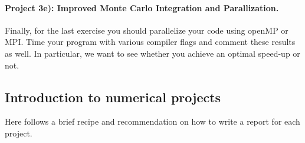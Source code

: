 \documentclass[%
oneside,                 %
final,                   %
10pt]{article}
\begin{document}
\paragraph{Project  3e): Improved Monte Carlo Integration and Parallization.}
Finally, for the last exercise you should parallelize your code using
openMP or MPI. Time your program with various compiler flags and
comment these results as well. In particular, we want to see whether
you achieve an optimal speed-up or not.









\subsection{Introduction to numerical projects}

Here follows a brief recipe and recommendation on how to write a report for each
project.
\end{document}

